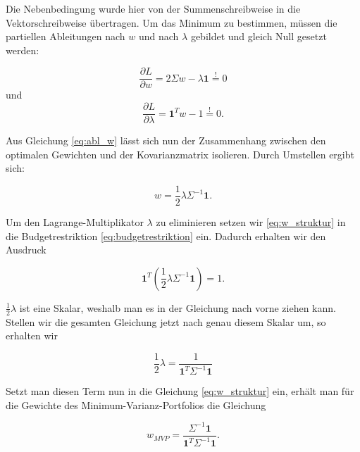 \documentclass[parskip=half]{scrartcl}
\begin{document}
	Die Nebenbedingung wurde hier von der Summenschreibweise in die Vektorschreibweise übertragen. Um das Minimum zu bestimmen, müssen die partiellen Ableitungen nach $w$ und nach $\lambda$ gebildet und gleich Null gesetzt werden:
	
	\begin{equation}
		\frac{\partial L}{\partial w} = 2 \Sigma w - \lambda \mathbf{1} \stackrel{!}{=} 0 \label{eq:abl_w}
	\end{equation}
	und
	\begin{equation}
		\frac{\partial L}{\partial \lambda} = \mathbf{1}^T w - 1 \stackrel{!}{=} 0. \label{eq:abl_lambda}
	\end{equation}
	
	Aus Gleichung \eqref{eq:abl_w} lässt sich nun der Zusammenhang zwischen den optimalen Gewichten und der Kovarianzmatrix isolieren. Durch Umstellen ergibt sich:
	
	\begin{equation}
		w = \frac{1}{2} \lambda \Sigma^{-1} \mathbf{1}. \label{eq:w_struktur}
	\end{equation}
	
	Um den Lagrange-Multiplikator $\lambda$ zu eliminieren setzen wir \eqref{eq:w_struktur} in die Budgetrestriktion \eqref{eq:budgetrestriktion} ein. Dadurch erhalten wir den Ausdruck
	
	\begin{equation*}
		\mathbf{1}^T \left(\frac{1}{2} \lambda \Sigma^{-1} \mathbf{1} \right) = 1.
	\end{equation*}
	
	$\frac{1}{2} \lambda$ ist eine Skalar, weshalb man es in der Gleichung nach vorne ziehen kann. Stellen wir die gesamten Gleichung jetzt nach genau diesem Skalar um, so erhalten wir
	
	\begin{equation*}
		\frac{1}{2} \lambda = \frac{1}{\mathbf{1}^T \Sigma^{-1} \mathbf{1}}
	\end{equation*}
	
	Setzt man diesen Term nun in die Gleichung \eqref{eq:w_struktur} ein, erhält man für die Gewichte des Minimum-Varianz-Portfolios die Gleichung
	
	\begin{equation}
		w_{MVP} = \frac{\Sigma^{-1}\mathbf{1}}{\mathbf{1}^T \Sigma^{-1} \mathbf{1}} . \label{eq:w_mvp}
	\end{equation}
	
	
\end{document}
